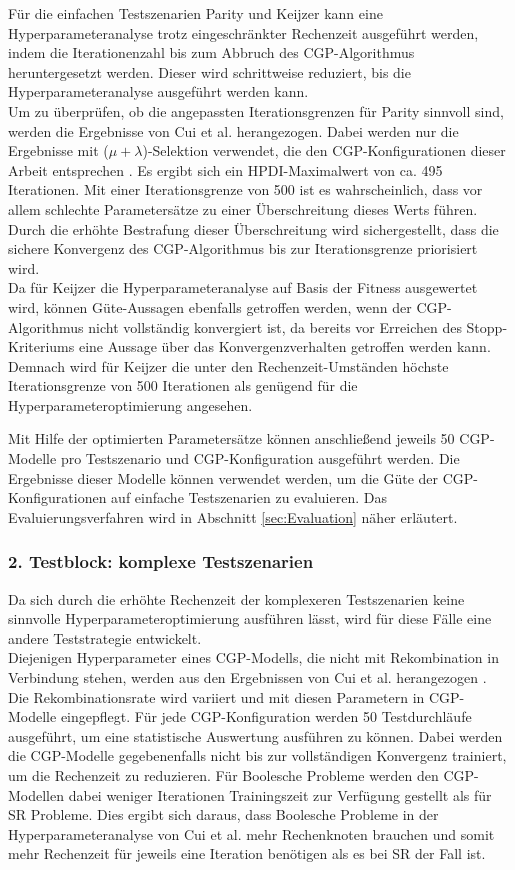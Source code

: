 Für die einfachen Testszenarien Parity und Keijzer kann eine Hyperparameteranalyse trotz eingeschränkter Rechenzeit ausgeführt werden, indem die Iterationenzahl bis zum Abbruch des CGP-Algorithmus heruntergesetzt werden.
Dieser wird schrittweise reduziert, bis die Hyperparameteranalyse ausgeführt werden kann.\\
Um zu überprüfen, ob die angepassten Iterationsgrenzen für Parity sinnvoll sind, werden die Ergebnisse von Cui et al. herangezogen. 
Dabei werden nur die Ergebnisse mit ($\mu + \lambda$)-Selektion verwendet, die den CGP-Konfigurationen dieser Arbeit entsprechen \cite{cui_results}.
Es ergibt sich ein HPDI-Maximalwert von ca. 495 Iterationen. 
Mit einer Iterationsgrenze von 500 ist es wahrscheinlich, dass vor allem schlechte Parametersätze zu einer Überschreitung dieses Werts führen.
Durch die erhöhte Bestrafung dieser Überschreitung wird sichergestellt, dass die sichere Konvergenz des CGP-Algorithmus bis zur Iterationsgrenze priorisiert wird.\\
Da für Keijzer die Hyperparameteranalyse auf Basis der Fitness ausgewertet wird, können Güte-Aussagen ebenfalls getroffen werden, wenn der CGP-Algorithmus nicht vollständig konvergiert ist, da bereits vor Erreichen des Stopp-Kriteriums eine Aussage über das Konvergenzverhalten getroffen werden kann.
Demnach wird für Keijzer die unter den Rechenzeit-Umständen höchste Iterationsgrenze von 500 Iterationen als genügend für die Hyperparameteroptimierung angesehen.

Mit Hilfe der optimierten Parametersätze können anschließend jeweils 50 CGP-Modelle pro Testszenario und CGP-Konfiguration ausgeführt werden.
Die Ergebnisse dieser Modelle können verwendet werden, um die Güte der CGP-Konfigurationen auf einfache Testszenarien zu evaluieren.
Das Evaluierungsverfahren wird in Abschnitt \ref{sec:Evaluation} näher erläutert.

\subsubsection{2. Testblock: komplexe Testszenarien}
\label{subsub:zweiterTestblock}
Da sich durch die erhöhte Rechenzeit der komplexeren Testszenarien keine sinnvolle Hyperparameteroptimierung ausführen lässt, wird für diese Fälle eine andere Teststrategie entwickelt.\\
Diejenigen Hyperparameter eines CGP-Modells, die nicht mit Rekombination in Verbindung stehen, werden aus den Ergebnissen von Cui et al. herangezogen \cite{cui_results}.
Die Rekombinationsrate wird variiert und mit diesen Parametern in CGP-Modelle eingepflegt.
Für jede CGP-Konfiguration werden 50 Testdurchläufe ausgeführt, um eine statistische Auswertung ausführen zu können.
Dabei werden die CGP-Modelle gegebenenfalls nicht bis zur vollständigen Konvergenz trainiert, um die Rechenzeit zu reduzieren. 
Für Boolesche Probleme werden den CGP-Modellen dabei weniger Iterationen Trainingszeit zur Verfügung gestellt als für SR Probleme.
Dies ergibt sich daraus, dass Boolesche Probleme in der Hyperparameteranalyse von Cui et al. mehr Rechenknoten brauchen und somit mehr Rechenzeit für jeweils eine Iteration benötigen als es bei SR der Fall ist. \cite{cui_results}

